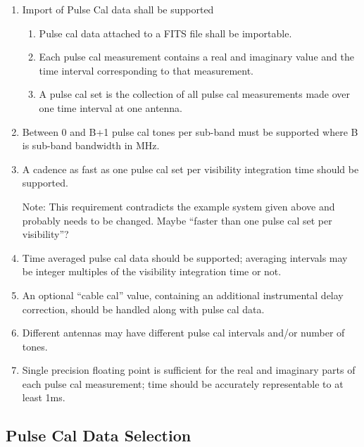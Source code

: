 \documentclass[11pt,a4paper]{article}
\begin{document}
\begin{enumerate}[subseclist]

\item Import of Pulse Cal data shall be supported

\begin{enumerate}[subsecsublist]

\item Pulse cal data attached to a FITS file shall be importable.

\item Each pulse cal measurement contains a real and imaginary value
  and the time interval corresponding to that measurement.

\item A pulse cal set is the collection of all pulse cal measurements
  made over one time interval at one antenna.

\end{enumerate}

\item Between 0 and B+1 pulse cal tones per sub-band must be supported
  where B is sub-band bandwidth in MHz.

\item A cadence as fast as one pulse cal set per visibility
  integration time should be supported.

  Note: This requirement contradicts the example system given above
  and probably needs to be changed.  Maybe ``faster than one pulse cal
  set per visibility''?

\item Time averaged pulse cal data should be supported; averaging
  intervals may be integer multiples of the visibility integration
  time or not.

\item An optional ``cable cal'' value, containing an additional
  instrumental delay correction, should be handled along with pulse
  cal data.

\item Different antennas may have different pulse cal intervals and/or
  number of tones.

\item Single precision floating point is sufficient for the real and
  imaginary parts of each pulse cal measurement; time should be
  accurately representable to at least 1ms.

\end{enumerate}

\subsection{Pulse Cal Data Selection}
\end{document}
